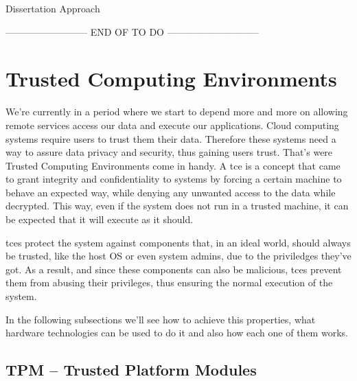 Dissertation Approach


-------------------------- END OF TO DO -----------------------------






\section{Trusted Computing Environments} %
\label{sec:tce}
We're currently in a period where we start to depend more and more on allowing remote services access our data and execute our applications. Cloud computing systems require users to trust them their data. Therefore these systems need a way to assure data privacy and security, thus gaining users trust. That's were Trusted Computing Environments come in handy.
A \gls{tce} is a concept that came to grant integrity and confidentiality to systems by forcing a certain machine to behave an expected way, while denying any unwanted access to the data while decrypted. This way, even if the system does not run in a trusted machine, it can be expected that it will execute as it should. 

\gls{tce}s protect the system against components that, in an ideal world, should always be trusted, like the host OS or even system admins, due to the priviledges they've got. As a result, and since these components can also be malicious, \gls{tce}s prevent them from abusing their privileges, thus ensuring the normal execution of the system. 

In the following subsections we'll see how to achieve this properties, what hardware technologies can be used to do it and also how each one of them works.

\subsection{TPM – Trusted Platform Modules }
\label{ssec:tpm_intro}

